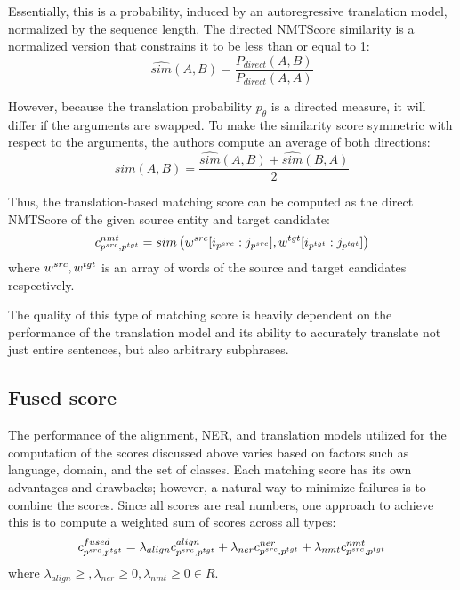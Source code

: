 Essentially, this is a probability, induced by an autoregressive translation model,
normalized by the sequence length. The directed NMTScore similarity is a normalized
version that constrains it to be less than or equal to 1:
\[
  \hat{sim}(A, B) = \frac{P_{direct}(A, B)}{P_{direct}(A, A)}
\]

However, because the translation probability \( p_{\theta} \) is a directed measure,
it will differ if the arguments are swapped. To make the similarity score symmetric
with respect to the arguments, the authors compute an average of both directions:
\[
  sim(A, B) = \frac{\hat{sim}(A, B) + \hat{sim}(B, A)}{2}
\]

Thus, the translation-based matching score can be computed as the direct NMTScore of
the given source entity and target candidate:
\begin{equation} \label{eq:nmt_cost}
  c_{p^{src}, p^{tgt}}^{nmt} =
  sim \left(w^{src}[i_{p^{src}} : j_{p^{src}}],
  w^{tgt}[i_{p^{tgt}} : j_{p^{tgt}}] \right)
\end{equation}
where \( w^{src}, w^{tgt} \) is an array of words of the source and target
candidates respectively.

The quality of this type of matching score is heavily dependent on the performance
of the translation model and its ability to accurately translate not just entire
sentences, but also arbitrary subphrases.

\subsection{Fused score}
The performance of the alignment, NER, and translation models utilized for the
computation of the scores discussed above varies based on factors such as language,
domain, and the set of classes. Each matching score has its own advantages and
drawbacks; however, a natural way to minimize failures is to combine the scores.
Since all scores are real numbers, one approach to achieve this is to compute a
weighted sum of scores across all types:
\begin{equation} \label{eq:fused_cost}
  c_{p^{src}, p^{tgt}}^{fused} =
  \lambda_{align} c_{p^{src}, p^{tgt}}^{align} +
  \lambda_{ner} c_{p^{src}, p^{tgt}}^{ner} +
  \lambda_{nmt} c_{p^{src}, p^{tgt}}^{nmt}
\end{equation}
where \( \lambda_{align} \geq, \lambda_{ner} \geq 0, \lambda_{nmt} \geq 0 \in R\).

